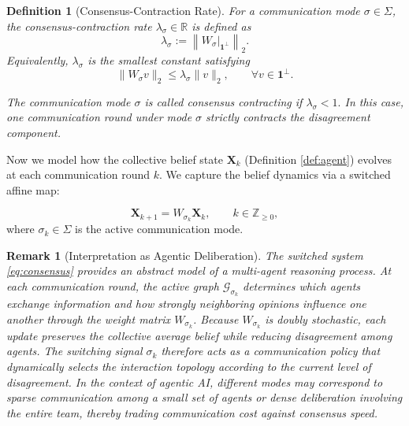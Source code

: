 \documentclass[journal,twoside,web]{ieeecolor_no_firstpage_logo}
\newtheorem{definition}{Definition}
\newtheorem{remark}{Remark}
\begin{document}
\begin{definition}[Consensus-Contraction Rate]\label{def:contraction}
For a communication mode $\sigma\in\Sigma$, the
\emph{consensus-contraction rate} $\lambda_\sigma \in \mathbb{R}$ is defined as
\[
\lambda_\sigma
:=
\left\|
W_\sigma\big|_{\mathbf 1^\perp}
\right\|_2 .
\]
Equivalently, $\lambda_\sigma$ is the smallest constant satisfying
\[
\|W_\sigma v\|_2
\le
\lambda_\sigma\|v\|_2,
\qquad
\forall v\in\mathbf 1^\perp .
\]

The communication mode $\sigma$ is called \emph{consensus contracting}
if
$
\lambda_\sigma<1.
$
In this case, one communication round under mode $\sigma$ strictly
contracts the disagreement component.
\end{definition}

 Now we model how the collective belief state $\mathbf{X}_k$ (Definition \ref{def:agent}) evolves at each communication round $k.$ We capture the belief dynamics via a switched affine map:

\begin{equation}
\mathbf{X}_{k+1}
=
W_{\sigma_k}\mathbf{X}_k,
\qquad
k\in\mathbb Z_{\ge0},
\label{eq:consensus}
\end{equation}
where $\sigma_k\in\Sigma$ is the active communication mode.

\begin{remark}[Interpretation as Agentic Deliberation]
The switched system \eqref{eq:consensus} provides an abstract model of
a multi-agent reasoning process. At each communication round, the
active graph $\mathcal G_{\sigma_k}$ determines which agents exchange
information and how strongly neighboring opinions influence one
another through the weight matrix $W_{\sigma_k}$.
Because $W_{\sigma_k}$ is doubly stochastic, each update preserves the
collective average belief while reducing disagreement among agents.
The switching signal $\sigma_k$ therefore acts as a communication
policy that dynamically selects the interaction topology according to
the current level of disagreement. In the context of agentic AI,
different modes may correspond to sparse communication among a small
set of agents or dense deliberation involving the entire team,
thereby trading communication cost against consensus speed.
\end{remark}
\end{document}
